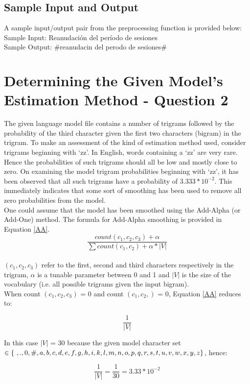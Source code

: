 \documentclass[12pt]{article}
\begin{document}
\subsection{Sample Input and Output}
A sample input/output pair from the preprocessing function is provided below:\\
\hfill\break
Sample Input: Reanudación del período de sesiones\\
Sample Output: \#reanudacin del perodo de sesiones\#
\section{Determining the Given Model's Estimation Method - Question 2} 
The given language model file contains a number of trigrams followed by the probability of the third character given the first two characters (bigram) in the trigram. To make an assessment of the kind of estimation method used, consider trigrams beginning with `zz'. In English, words containing a `zz' are very rare. Hence the probabilities of such trigrams should all be low and mostly close to zero. On examining the model trigram probabilities beginning with `zz', it has been observed that all such trigrams have a probability of $3.333 * 10^{-2}$.  This immediately indicates that some sort of smoothing has been used to remove all zero probabilities from the model.\\
\hfill\break
One could assume that the model has been smoothed using the Add-Alpha (or Add-One) method. The formula for Add-Alpha smoothing is provided in Equation \ref{AA}.
\begin{equation}\label{AA}
 \dfrac{{count(c_{1},c_{2},c_{3})} + \alpha} {\sum count(c_1,c_2)+ \alpha * |V|} 
\end{equation}\\  
$(c_1,c_2,c_3)$ refer to the first, second and third characters respectively in the trigram, $\alpha$ is a tunable parameter between 0 and 1 and $|V|$ is the size of the vocabulary (i.e. all possible trigrams given the input bigram).\\
\hfill\break
When count $(c_1,c_2,c_3)$ = 0 and count $(c_1,c_2,)$ = 0, Equation \ref{AA} reduces to:

\[\dfrac{1} {|V|} \]

In this case $|V|$ = 30 because the given model character set $ \in \{  \  ,.,0,\#,a,b,c,d,e,f,g,h,i,\\k,l,m,n,o,p,q,r,s,t,u,v,w,x,y,z\}$, hence:

\[\dfrac{1} {|V|}  = \dfrac{1} {30} = 3.33 * 10^{-2}\]
\end{document}
